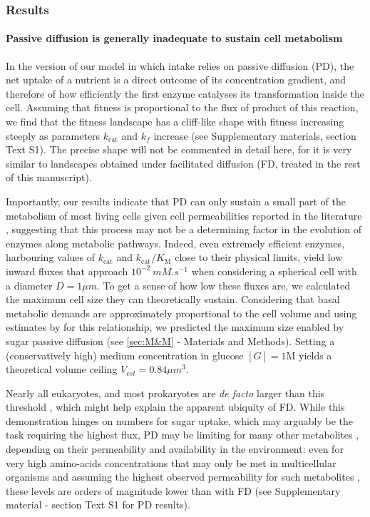 \subsubsection{Results\label{sec:Results}}

\paragraph{\noindent Passive diffusion is generally inadequate to sustain cell metabolism}

In the version of our model in which intake relies on passive diffusion (PD), the net uptake of a nutrient is a direct outcome of its concentration gradient, and therefore of how efficiently the first enzyme catalyses its transformation inside the cell. Assuming that fitness is proportional to the flux of product of this reaction, we find that the fitness landscape has a cliff-like shape with fitness increasing steeply as parameters $k_\text{cat}$ and $k_f$ increase (see Supplementary materials, section Text S1). The precise shape will not be commented in detail here, for it is very similar to landscapes obtained under facilitated diffusion (FD, treated in the rest of this manuscript). 

Importantly, our results indicate that PD can only sustain a small part of the metabolism of most living cells given cell permeabilities reported in the literature \citep{Wood68,Milo10}, suggesting that this process may not be a determining factor in the evolution of enzymes along metabolic pathways. Indeed, even extremely efficient enzymes, harbouring values of $k_\text{cat}$ and $k_\text{cat}/K_\text{M}$ close to their physical limits, yield low inward fluxes that approach $10^{-2}~mM.s^{-1}$ when considering a spherical cell with a diameter $D=1 \mu m$. To get a sense of how low these fluxes are, we calculated the maximum cell size they can theoretically sustain. Considering that basal metabolic demands are approximately proportional to the cell volume and using estimates by \citet{Lynch15} for this relationship, we predicted the maximum size enabled by sugar passive diffusion (see \ref{sec:M&M} - Materials and Methods). Setting a (conservatively high) medium concentration in glucose $[G]=1$M yields a theoretical volume ceiling $V_{est}=0.84 \mu m^3$. 

Nearly all eukaryotes, and most prokaryotes are \textit{de facto} larger than this threshold \citep{Heim17}, which might help explain the apparent ubiquity of FD. While this demonstration hinges on numbers for sugar uptake, which may arguably be the task requiring the highest flux, PD may be limiting for many other metabolites \citep{Boer10}, depending on their permeability and availability in the environment: even for very high amino-acids concentrations that may only be met in multicellular organisms \citep{Schmidt16} and assuming the highest observed permeability for such metabolites \citep{Chakrabarti94}, these levels are orders of magnitude lower than with FD (see Supplementary material - section Text S1 for PD results).

